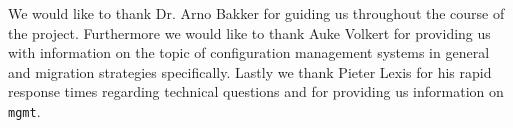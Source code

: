We would like to thank Dr. Arno Bakker for guiding us throughout the course of the project. Furthermore we would like to thank Auke Volkert for providing us with information on the topic of configuration management systems in general and migration strategies specifically. Lastly we thank Pieter Lexis for his rapid response times regarding technical questions and for providing us information on \texttt{mgmt}. 
